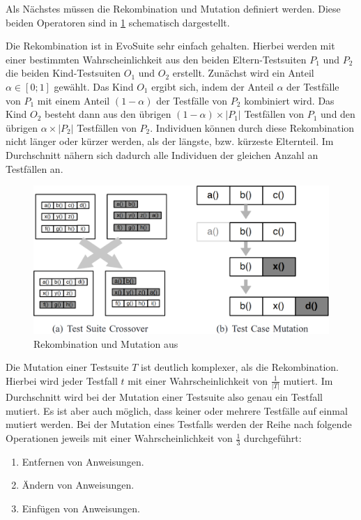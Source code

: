 \documentclass[a4paper,11pt]{article}
\begin{document}
Als Nächstes müssen die Rekombination und Mutation definiert werden.
Diese beiden Operatoren sind in \cref{fig:rekombination_und_mutation} schematisch dargestellt.

Die Rekombination ist in EvoSuite sehr einfach gehalten.
Hierbei werden mit einer bestimmten Wahrscheinlichkeit aus den beiden Eltern-Testsuiten $P_1$ und $P_2$ die beiden Kind-Testsuiten $O_1$ und $O_2$ erstellt.
Zunächst wird ein Anteil $\alpha \in [0;1]$ gewählt.
Das Kind $O_1$ ergibt sich, indem der Anteil $\alpha$ der Testfälle von $P_1$ mit einem Anteil $(1 - \alpha)$ der Testfälle von $P_2$ kombiniert wird.
Das Kind $O_2$ besteht dann aus den übrigen $(1 - \alpha) \times |P_1|$ Testfällen von $P_1$ und den übrigen $\alpha \times |P_2|$ Testfällen von $P_2$.
Individuen können durch diese Rekombination nicht länger oder kürzer werden, als der längste, bzw. kürzeste Elternteil.
Im Durchschnitt nähern sich dadurch alle Individuen der gleichen Anzahl an Testfällen an.

\begin{figure}
	\includegraphics[width=\textwidth]{evosuite-crossover-and-mutation.png}
	\caption{Rekombination und Mutation aus \citep{TSE12_EvoSuite}}
	\label{fig:rekombination_und_mutation}
\end{figure}

Die Mutation einer Testsuite $T$ ist deutlich komplexer, als die Rekombination.
Hierbei wird jeder Testfall $t$ mit einer Wahrscheinlichkeit von $\frac{1}{|T|}$ mutiert.
Im Durchschnitt wird bei der Mutation einer Testsuite also genau ein Testfall mutiert.
Es ist aber auch möglich, dass keiner oder mehrere Testfälle auf einmal mutiert werden. Bei der Mutation eines Testfalls werden der Reihe nach folgende Operationen jeweils mit einer Wahrscheinlichkeit von $\frac{1}{3}$ durchgeführt:
\begin{enumerate}
	\item Entfernen von Anweisungen.
	\item Ändern von Anweisungen.
	\item Einfügen von Anweisungen.
\end{enumerate}
\end{document}
